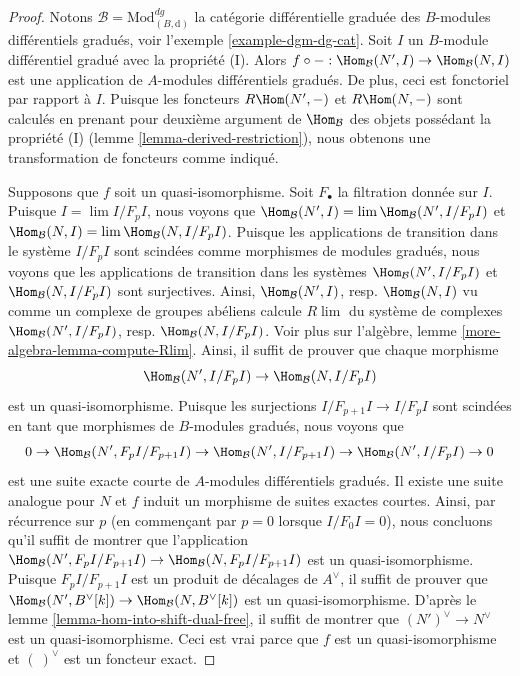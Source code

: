 \begin{proof}
Notons $\mathcal{B} = \text{Mod}^{dg}_{(B, \text{d})}$ la
catégorie différentielle graduée des $B$-modules différentiels gradués, voir
l'exemple \ref{example-dgm-dg-cat}. Soit $I$
un $B$-module différentiel gradué avec la propriété (I). Alors $f \circ
- : \Hom_\mathcal{B}(N', I) \to \Hom_\mathcal{B}(N, I)$ est une application de
$A$-modules différentiels gradués. De plus, ceci est fonctoriel par rapport à $I$.
Puisque les foncteurs $ R\Hom(N', -)$ et
$R\Hom(N, -)$ sont calculés en prenant pour
deuxième argument de $\Hom_\mathcal{B}$ des objets possédant la propriété (I)
(lemme \ref{lemma-derived-restriction}), nous obtenons une transformation de foncteurs comme
indiqué.

\medskip\noindent
Supposons que $f$ soit un quasi-isomorphisme. Soit $F_\bullet$ la
filtration donnée sur $I$. Puisque $I = \lim I/F_pI$, nous voyons que
$\Hom_\mathcal{B}(N', I) = \lim \Hom_\mathcal{B}(N', I/F_pI)$ et
$\Hom_\mathcal{B}(N, I) = \lim \Hom_\mathcal{B}(N, I/F_pI)$. Puisque les
applications de transition dans le système $I/F_pI$ sont scindées comme
morphismes de modules gradués, nous voyons que les applications de
transition dans les systèmes $\Hom_\mathcal{B}(N', I/F_pI)$ et $\Hom_\mathcal{B}(N,
I/F_pI)$ sont surjectives. Ainsi, $\Hom_\mathcal{B}(N', I)$, resp. $\Hom_\mathcal{B}(N, I)$
vu comme un complexe de groupes abéliens calcule $R\lim$ du système de
complexes
$\Hom_\mathcal{B}(N', I/F_pI)$, resp. $\Hom_\mathcal{B}(N, I/F_pI)$. Voir plus sur
l'algèbre, lemme \ref{more-algebra-lemma-compute-Rlim}. Ainsi, il suffit de
prouver que chaque morphisme
$$
\Hom_\mathcal{B}(N', I/F_pI) \to \Hom_\mathcal{B}(N, I/F_pI)
$$
est un quasi-isomorphisme. Puisque les surjections $I/F_{p + 1}I \to I/F_pI$ sont
scindées en tant que morphismes de $B$-modules gradués, nous voyons que
$$
0 \to \Hom_\mathcal{B}(N', F_pI/F_{p + 1}I) \to
\Hom_\mathcal{B}(N', I/F_{p + 1}I) \to
\Hom_\mathcal{B}(N', I/F_pI) \to 0
$$
est une suite exacte courte de $A$-modules différentiels gradués. Il
existe une suite analogue pour $N$ et $f$ induit un morphisme
de suites exactes courtes. Ainsi, par récurrence sur $p$ (en commençant par $p = 0$
lorsque $I/F_0I = 0$), nous concluons qu'il suffit de montrer que
l'application
$\Hom_\mathcal{B}(N', F_pI/F_{p + 1}I) \to \Hom_\mathcal{B}(N, F_pI/F_{p + 1}I)$ est un
quasi-isomorphisme. Puisque $F_pI/F_{p + 1}I$ est un produit de décalages de
$A^\vee$, il suffit de prouver que
$\Hom_\mathcal{B}(N', B^\vee[k]) \to \Hom_\mathcal{B}(N, B^\vee[k])$ est un
quasi-isomorphisme. D'après le lemme \ref{lemma-hom-into-shift-dual-free}, il
suffit de montrer que $(N')^\vee \to N^\vee$ est un quasi-isomorphisme. Ceci est
vrai parce que $f$ est un quasi-isomorphisme et $(\ )^\vee$ est un
foncteur exact.
\end{proof}

